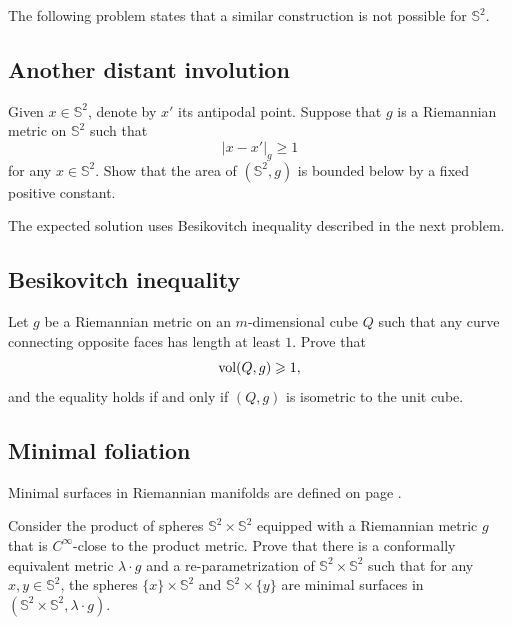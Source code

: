 The following problem states that a similar construction is not possible for $\mathbb{S}^2$. 


\subsection*{Another distant involution}
\label{Another distant involution}

\begin{pr}
Given $x\in \mathbb{S}^2$, denote by $x'$ its antipodal point.
Suppose that $g$ is a Riemannian metric on $\mathbb{S}^2$ such that
\[|x-x'|_g\ge1\]
for any $x\in\mathbb{S}^2$.
Show that the area of $(\mathbb{S}^2,g)$ is bounded below by a fixed positive constant. 
\end{pr}

The expected solution uses Besikovitch inequality described in the next problem.


\subsection*{Besikovitch inequality}
\label{Besikovitch inequality}

\begin{pr}
Let $g$ be a Riemannian metric on an $m$-dimensional cube $Q$ such that any curve connecting opposite faces has length at least $1$. 
Prove that 
\[\operatorname{\rm vol}\nolimits(Q,g)\geqslant 1,\] 
and the equality holds if and only if $(Q,g)$ is isometric to the unit cube.
\end{pr}



\subsection*{Minimal foliation\thm}
\label{gromomorphic-curves}

Minimal surfaces in Riemannian manifolds are defined on page \pageref{minimal surface}.

\begin{pr}
Consider the product of spheres $\mathbb{S}^2\times \mathbb{S}^2$ equipped with a Riemannian metric $g$ that is $C^\infty$-close to the product metric. 
Prove that there is a conformally equivalent metric $\lambda\cdot g$ and a re-parametrization of $\mathbb{S}^2\times \mathbb{S}^2$
such that for any $x,y\in \mathbb{S}^2$, the spheres $\{x\}\times\mathbb{S}^2$ and $\mathbb{S}^2\times \{y\}$ are minimal surfaces 
in $(\mathbb{S}^2\times \mathbb{S}^2,\lambda\cdot g)$.
\end{pr}


